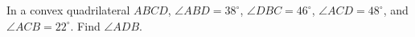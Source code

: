 In a convex quadrilateral $ABCD$, $\angle ABD=38^\circ$, $\angle DBC=46^\circ$, $\angle ACD=48^\circ$, and $\angle ACB=22^\circ$. Find $\angle ADB$.
